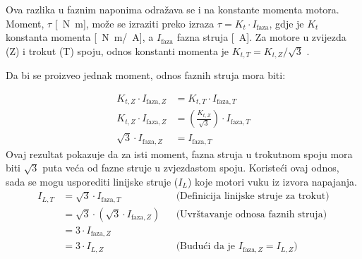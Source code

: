 \documentclass[diplomskirad, upload]{fer}
\begin{document}
Ova razlika u faznim naponima odražava se i na konstante momenta motora.
Moment, $\tau$ [\SI{}{\newton\metre}], može se izraziti preko izraza $\tau =
	K_t \cdot I_{\text{faza}}$, gdje je $K_t$ konstanta momenta
	[\SI{}{\newton\metre}/\SI{}{\ampere}], a $I_{\text{faza}}$ fazna struja
	[\SI{}{\ampere}]. Za motore u zvijezda (Z) i trokut (T) spoju, odnos konstanti
momenta je $K_{t, T} = K_{t, Z} / \sqrt{3}$ \cite{cite:disertacija}.

Da bi se proizveo jednak moment, odnos faznih struja mora biti:

\begin{align*}
	K_{t,Z} \cdot I_{\text{faza},Z}  & = K_{t,T} \cdot I_{\text{faza},T}                                 \\
	K_{t,Z} \cdot I_{\text{faza},Z}  & = \left( \frac{K_{t,Z}}{\sqrt{3}} \right) \cdot I_{\text{faza},T} \\
	\sqrt{3} \cdot I_{\text{faza},Z} & = I_{\text{faza},T}
\end{align*}
Ovaj rezultat pokazuje da za isti moment, fazna struja u trokutnom spoju mora biti $\sqrt{3}$ puta veća od fazne struje u zvjezdastom spoju.
Koristeći ovaj odnos, sada se mogu usporediti linijske struje ($I_L$) koje motori vuku iz izvora napajanja.
\begin{align*}
	I_{L,T} & = \sqrt{3} \cdot I_{\text{faza},T}                  &  & \text{(Definicija linijske struje za trokut)}              \\
	        & = \sqrt{3} \cdot (\sqrt{3} \cdot I_{\text{faza},Z}) &  & \text{(Uvrštavanje odnosa faznih struja)}                  \\
	        & = 3 \cdot I_{\text{faza},Z}                                                                                         \\
	        & = 3 \cdot I_{L,Z}                                   &  & \text{(Budući da je } I_{\text{faza},Z} = I_{L,Z} \text{)}
\end{align*}
\end{document}

